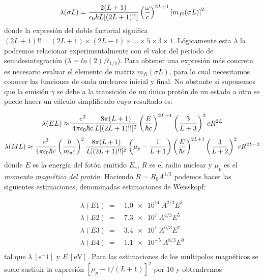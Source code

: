 \begin{equation}
	\lambda (\sigma L) = \frac{2(L+1)}{\epsilon_0 \hbar L [(2L+1)!!]} \left( \frac{\omega}{c} \right)^{2L+1} \left[ m_{fi}(\sigma L) \right]^2
\end{equation}
donde la expresión del doble factorial significa $(2L+1)!!=(2L+1)\times(2L-1) \times \ldots \times 5 \times 3 \times 1$. Lógicamente esta $\lambda$ la podremos relacionar experimentalmente con el valor del periodo de semidesintegración ($\lambda=ln(2)/t_{1/2}$). Para obtener una expresión más concreta es necesario evaluar el elemento de matriz $m_{fi}(\sigma L)$, para lo cual necesitamos conocer las funciones de onda nucleares inicial y final. No obstante si suponemos que la emisión $\gamma$ se debe a la transición de un único protón de un estado a otro se puede hacer un cálculo simplificado cuyo resultado es:

\begin{eqnarray}	
	\lambda(EL) \approx \frac{e^2}{4\pi\epsilon_0 \hbar c} \frac{8\pi (L+1)}{L[(2L+1)!!]^2} \left( \frac{E}{\hbar c} \right)^{2L+1} \left( \frac{3}{L+3} \right)^2 cR^{2L}
\end{eqnarray}
\begin{eqnarray}	
	\lambda(ML) \approx \frac{e^2}{4\pi\epsilon_0 \hbar c} \left( \frac{\hbar}{m_pc} \right)^2 \frac{8\pi (L+1)}{L[(2L+1)!!]^2} \left( \mu_p - \frac{1}{L+1} \right) \left( \frac{E}{\hbar c} \right)^{2L+1} \left( \frac{3}{L+2} \right)^2 cR^{2L-2}
\end{eqnarray}
donde $E$ es la energía del fotón emitido $E_\gamma$, $R$ es el radio nuclear y $\mu_p$ es el \textit{momento magnético del protón}. Haciendo $R=R_0 A^{1/3}$ podemos hacer las siguientes estimaciones, denominadas estimaciones de Weisskopf:

\begin{equation}
	\begin{split}
	\lambda (E1) \ = \ & \unit{\num{1.0e14} \ A^{2/3}E^3} \\
	\lambda (E2) \ = \ & \unit{\num{7.3e7} \ A^{4/3}E^5} \\
	\lambda (E3) \ = \ & \unit{\num{3.4e1} \ A^{6/3}E^7} \\
	\lambda (E4) \ = \ & \unit{\num{1.1e-5} \ A^{8/3}E^9} \\
	\end{split}
\end{equation}
tal que $\lambda \ [\unit{\s^-1}]$ y $E \ [\unit{\eV}]$. Para las estimaciones de los multipolos magnéticos se suele sustiuir la expresión $[\mu_p-1/(L+1)]^2$ por 10 y obtendremos

